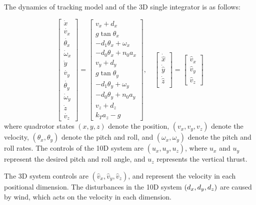 The dynamics of tracking model and of the 3D single integrator is as follows:

\begin{equation}
\label{eq:Quad10D_dyn}
\begin{bmatrix}
\dot{x}\\
\dot{v_x}\\
\dot{\theta_x}\\
\dot\omega_x\\
\dot{y}\\
\dot{v_y}\\
\dot{\theta_y}\\
\dot\omega_y\\
\dot{z}\\
\dot{v_z}
\end{bmatrix}
=
\begin{bmatrix}
v_x + d_x\\
g \tan \theta_x\\
-d_1 \theta_x + \omega_x\\
-d_0 \theta_x + n_0 a_x\\
v_y + d_y\\
g \tan \theta_y\\
-d_1 \theta_y + \omega_y\\
-d_0 \theta_y + n_0 a_y\\
v_z + d_z\\
k_T a_z - g
\end{bmatrix}, \quad
\begin{bmatrix}
\dot{\hat x}\\
\dot{\hat y}\\
\dot{\hat z}\\
\end{bmatrix} =
\begin{bmatrix}
\hat v_x \\
\hat v_y \\
\hat v_z
\end{bmatrix}
\end{equation}
\noindent where quadrotor states $(x, y, z)$ denote the position, $(v_x, v_y, v_z)$ denote the velocity, $(\theta_x, \theta_y)$ denote the pitch and roll, and $(\omega_x, \omega_y)$ denote the pitch and roll rates. 
The controls of the 10D system are $(u_x, u_y, u_z)$, where $u_x$ and $u_y$ represent the desired pitch and roll angle, and $u_z$ represents the vertical thrust.

The 3D system controls are $(\hat v_x, \hat v_y, \hat v_z)$, and represent the velocity in each positional dimension. 
The disturbances in the 10D system $(d_x, d_y, d_z)$ are caused by wind, which acts on the velocity in each dimension. 

